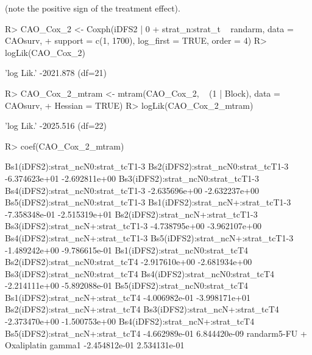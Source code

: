 \documentclass[article,nojss,shortnames]{jss}\usepackage[]{graphicx}\usepackage[]{xcolor}
\begin{document}
(note the positive sign of the treatment effect).
\begin{Schunk}
\begin{Sinput}
R> CAO_Cox_2 <- Coxph(iDFS2 | 0 + strat_n:strat_t ~ randarm, data = CAOsurv, 
+                     support = c(1, 1700), log_first = TRUE, order = 4)
R> logLik(CAO_Cox_2)
\end{Sinput}
\begin{Soutput}
'log Lik.' -2021.878 (df=21)
\end{Soutput}
\begin{Sinput}
R> CAO_Cox_2_mtram <- mtram(CAO_Cox_2, ~ (1 | Block), data = CAOsurv, 
+                           Hessian = TRUE)
R> logLik(CAO_Cox_2_mtram)
\end{Sinput}
\begin{Soutput}
'log Lik.' -2025.516 (df=22)
\end{Soutput}
\begin{Sinput}
R> coef(CAO_Cox_2_mtram)
\end{Sinput}
\begin{Soutput}
Bs1(iDFS2):strat_ncN0:strat_tcT1-3 Bs2(iDFS2):strat_ncN0:strat_tcT1-3 
                     -6.374623e+01                      -2.692811e+00 
Bs3(iDFS2):strat_ncN0:strat_tcT1-3 Bs4(iDFS2):strat_ncN0:strat_tcT1-3 
                     -2.635696e+00                      -2.632237e+00 
Bs5(iDFS2):strat_ncN0:strat_tcT1-3 Bs1(iDFS2):strat_ncN+:strat_tcT1-3 
                     -7.358348e-01                      -2.515319e+01 
Bs2(iDFS2):strat_ncN+:strat_tcT1-3 Bs3(iDFS2):strat_ncN+:strat_tcT1-3 
                     -4.738795e+00                      -3.962107e+00 
Bs4(iDFS2):strat_ncN+:strat_tcT1-3 Bs5(iDFS2):strat_ncN+:strat_tcT1-3 
                     -1.489242e+00                      -9.786615e-01 
  Bs1(iDFS2):strat_ncN0:strat_tcT4   Bs2(iDFS2):strat_ncN0:strat_tcT4 
                     -2.917610e+00                      -2.681934e+00 
  Bs3(iDFS2):strat_ncN0:strat_tcT4   Bs4(iDFS2):strat_ncN0:strat_tcT4 
                     -2.214111e+00                      -5.892088e-01 
  Bs5(iDFS2):strat_ncN0:strat_tcT4   Bs1(iDFS2):strat_ncN+:strat_tcT4 
                     -4.006982e-01                      -3.998171e+01 
  Bs2(iDFS2):strat_ncN+:strat_tcT4   Bs3(iDFS2):strat_ncN+:strat_tcT4 
                     -2.373470e+00                      -1.500753e+00 
  Bs4(iDFS2):strat_ncN+:strat_tcT4   Bs5(iDFS2):strat_ncN+:strat_tcT4 
                     -4.662989e-01                       6.844420e-09 
         randarm5-FU + Oxaliplatin                             gamma1 
                     -2.454812e-01                       2.534131e-01 
\end{Soutput}
\end{Schunk}
\end{document}
